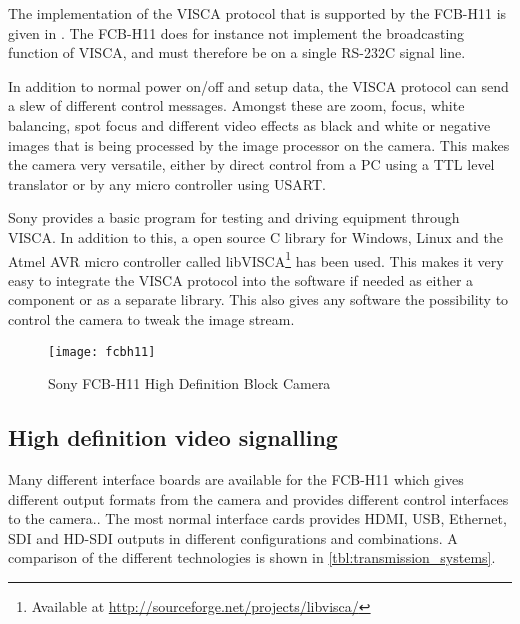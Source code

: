 The implementation of the VISCA protocol that is supported by the FCB-H11 is given in \citet{fcbh11tech}. 
The FCB-H11 does for instance not implement the broadcasting function of VISCA, and must therefore 
be on a single RS-232C signal line. 

In addition to normal power on/off and setup data, the VISCA protocol can send a slew of different 
control messages. Amongst these are zoom, focus, white balancing, spot focus and different video effects as 
black and white or negative images that is being processed by the image processor on the camera. This 
makes the camera very versatile, either by direct control from a PC using a TTL level translator or 
by any micro controller using USART.

Sony provides a basic program for testing and driving equipment through VISCA. In addition to this, a open source C library for Windows, Linux and 
the Atmel AVR micro controller called libVISCA\footnote{Available at \url{http://sourceforge.net/projects/libvisca/}} has been used. This makes it very easy to 
integrate the VISCA protocol into the software if needed as either a component or as a separate library. This also gives any software the 
possibility to control the camera to tweak the image stream.

\begin{figure}[htbp]
	\centering
	\texttt{[image: fcbh11]}
	\caption{Sony FCB-H11 High Definition Block Camera}
	\label{fig:fcb-h11}
\end{figure}

\subsection{High definition video signalling}

Many different interface boards are available for the FCB-H11 which gives different output formats from the camera and 
provides different control interfaces to the camera..
The most normal interface cards provides HDMI, USB, Ethernet, SDI and HD-SDI outputs in 
different configurations and combinations. A comparison of the different technologies is shown in \vref{tbl:transmission_systems}.

